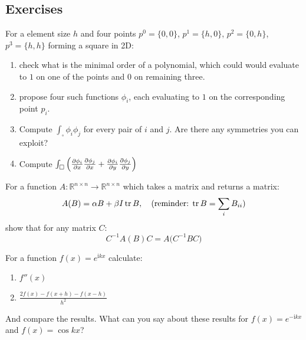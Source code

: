 \documentclass[12pt,class=article,crop=false,preview=false]{standalone}
\begin{document}
\subsection*{Exercises}

\begin{exercise}
For a element size $h$ and four points $p^0=\{0,0\}$, $p^1=\{h,0\}$, $p^2=\{0,h\}$, $p^3=\{h,h\}$ forming a square in 2D:
\begin{enumerate}[label=\alph*)]
\item check what is the minimal order of a polynomial, which could would evaluate to $1$ on one of the points and $0$ on remaining three.
\item propose four such functions $\phi_i$, each evaluating to $1$ on the corresponding point $p_i$.
\item Compute $\int_\square\phi_i\phi_j$ for every pair of $i$ and $j$. Are there any symmetries you can exploit?
\item Compute $\int_\square \left(\frac{\partial \phi_i}{\partial x}\frac{\partial \phi_j}{\partial x} + \frac{\partial \phi_i}{\partial y}\frac{\partial \phi_j}{\partial y}\right)$
\end{enumerate}
\end{exercise}

\begin{exercise}
For a function $A:\mathbb{R}^{n\times n}\rightarrow\mathbb{R}^{n\times n}$ which takes a matrix and returns a matrix:
\[A(B) = \alpha B + \beta I \operatorname{tr}{B},\quad\text{(reminder: $\operatorname{tr}{B}=\sum_iB_{ii}$)}\]
show that for any matrix $C$:
\[C^{-1}A(B)C = A\big(C^{-1}BC\big)\]
\end{exercise}

\begin{exercise}
For a function $f(x) = e^{\mathrm{i}kx}$ calculate:
\begin{enumerate}[label=\alph*)]
\item $f''(x)$
\item $\frac{2f(x)-f(x+h)-f(x-h)}{h^2}$
\end{enumerate}
And compare the results. What can you say about these results for $f(x) = e^{-\mathrm{i}kx}$ and $f(x) = \cos{kx}$?
\end{exercise}
\end{document}
